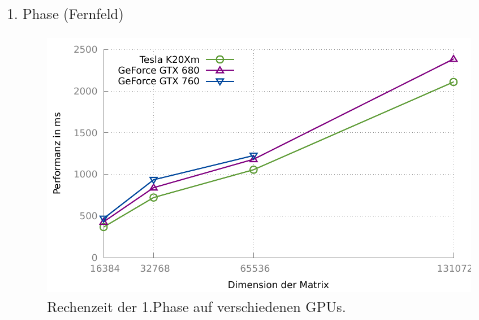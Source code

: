 \documentclass[10pt]{beamer}
\begin{document}
\begin{frame}{1. Phase (Fernfeld)}
  \begin{figure}
    \centering
    \includegraphics[width=\linewidth]{figures/fg-performance-ff.pdf}
    \caption{Rechenzeit der 1.Phase auf verschiedenen GPUs.}
  \end{figure}
\end{frame}
\end{document}
